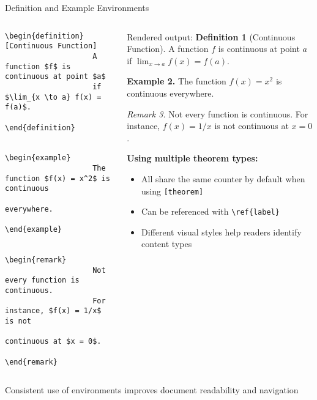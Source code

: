 \begin{frame}[fragile]{Definition and Example Environments}
	\begin{columns}
		\begin{column}{0.5\textwidth}
			\begin{lstlisting}[basicstyle=\footnotesize\ttfamily]
				\begin{definition}[Continuous Function]
					A function $f$ is continuous at point $a$
					if $\lim_{x \to a} f(x) = f(a)$.
				\end{definition}
				
				\begin{example}
					The function $f(x) = x^2$ is continuous
					everywhere.
				\end{example}
				
				\begin{remark}
					Not every function is continuous.
					For instance, $f(x) = 1/x$ is not 
					continuous at $x = 0$.
				\end{remark}
			\end{lstlisting}
		\end{column}
		
		\begin{column}{0.5\textwidth}
			\begin{block}{Rendered output:}
				\textbf{Definition 1} (Continuous Function). A function $f$ is continuous at point $a$ if $\lim_{x \to a} f(x) = f(a)$.
				
				\textbf{Example 2.} The function $f(x) = x^2$ is continuous everywhere.
				
				\textit{Remark 3.} Not every function is continuous. For instance, $f(x) = 1/x$ is not continuous at $x = 0$.
			\end{block}
			
			\textbf{Using multiple theorem types:}
			\begin{itemize}
				\item All share the same counter by default when using \texttt{[theorem]}
				\item Can be referenced with \texttt{\textbackslash ref\{label\}}
				\item Different visual styles help readers identify content types
			\end{itemize}
		\end{column}
	\end{columns}
	
	\begin{tip}
		Consistent use of environments improves document readability and navigation
	\end{tip}
\end{frame}

